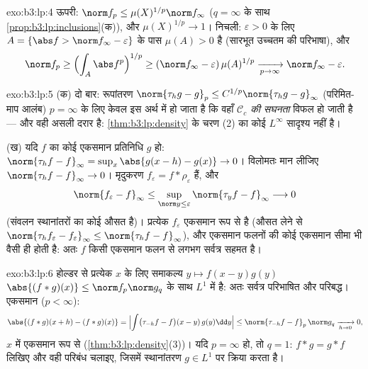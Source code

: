 \begin{solution}{exo:b3:lp:4}
ऊपरी: $\norm f_p \leq \mu(X)^{1/p}\norm f_\infty$ ($q = \infty$ के साथ \cref{prop:b3:lp:inclusions}(क)), और $\mu(X)^{1/p} \to 1$। निचली: $\varepsilon > 0$ के लिए $A =
\{\abs f > \norm f_\infty - \varepsilon\}$
के पास $\mu(A) > 0$ है (सारभूत उच्चतम की परिभाषा), और
\[
\norm f_p \geq \Bigl(\int_A \abs f^p\Bigr)^{1/p}
\geq (\norm f_\infty - \varepsilon)\,\mu(A)^{1/p}
\xrightarrow[p\to\infty]{} \norm f_\infty - \varepsilon .
\]
\end{solution}

\begin{solution}{exo:b3:lp:5}
(क) दो बार: रूपांतरण $\norm{\tau_hg - g}_p \leq
C^{1/p}\norm{\tau_hg - g}_\infty$ (परिमित-माप आलंब) $p = \infty$ के लिए केवल इस
अर्थ में  हो जाता है कि वहाँ \emph{$\mathcal C_c$ की सघनता} विफल हो जाती
है --- और वही असली दरार है: \cref{thm:b3:lp:density} के चरण (2) का कोई $L^\infty$ सादृश्य
नहीं है।

(ख) यदि $f$ का कोई एकसमान  प्रतिनिधि $g$ हो: $\norm{\tau_hf - f}_\infty = \sup_x\abs{g(x - h) - g(x)} \to
0$। विलोमतः
मान लीजिए $\norm{\tau_hf - f}_\infty \to 0$। मृदुकरण $f_\varepsilon = f * \rho_\varepsilon$  हैं, और
\[
\norm{f_\varepsilon - f}_\infty
\leq \sup_{\norm y \leq \varepsilon}\norm{\tau_yf -
f}_\infty \longrightarrow 0
\]
(संवलन स्थानांतरों का कोई औसत है)। प्रत्येक $f_\varepsilon$ एकसमान रूप से 
है (औसत लेने से $\norm{\tau_hf_\varepsilon - f_\varepsilon}_\infty \leq
\norm{\tau_hf - f}_\infty$), और एकसमान  फलनों की कोई एकसमान सीमा भी
वैसी ही होती है: अतः $f$ किसी एकसमान  फलन से लगभग सर्वत्र सहमत
है।
\end{solution}

\begin{solution}{exo:b3:lp:6}
होल्डर से प्रत्येक $x$ के लिए समाकल्य $y \mapsto f(x -
y)g(y)$ $\abs{(f*g)(x)} \leq \norm f_p\norm
g_q$ के साथ $L^1$ में
है: अतः सर्वत्र परिभाषित और परिबद्ध। एकसमान  ($p <
\infty$):
\[
\abs{(f*g)(x + h) - (f*g)(x)}
= \Bigl|\int\bigl(\tau_{-h}f - f\bigr)(x - y)\,g(y)\dd y\Bigr|
\leq \norm{\tau_{-h}f - f}_p\,\norm g_q
\xrightarrow[h\to0]{} 0,
\]
$x$ में एकसमान रूप से (\cref{thm:b3:lp:density}(3))। यदि $p =
\infty$ हो, तो $q = 1$: $f * g = g * f$ लिखिए
और वही परिबंध चलाइए, जिसमें स्थानांतरण $g \in L^1$ पर क्रिया करता है।
\end{solution}

